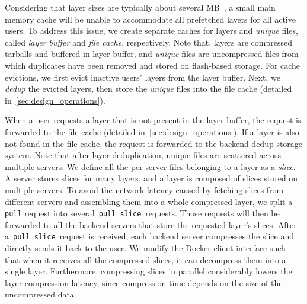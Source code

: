 


Considering that layer sizes are typically about several MB~\cite{dockerworkload}, 
a small main memory cache will be unable to accommodate
all prefetched layers for all active users. 
To address this issue, we 
create separate caches for layers and \emph{unique} files, called {\em layer buffer} and {\em file cache}, respectively. 
Note that, layers are  compressed tarballs and buffered in layer buffer, and 
 \emph{unique} files are uncompressed files from which duplicates have been removed and stored on flash-based storage. 
For 
cache evictions, we first evict inactive users' layers from the layer buffer.
Next, we \emph{dedup} the evicted layers, then store the \emph{unique} files
into the file cache (detailed in~\cref{sec:design_operations}). 

When a user requests a
layer that is not present in the layer buffer, the request is forwarded to the
file cache (detailed in~\cref{sec:design_operations}). 
If a layer is also not found in the
file cache, the request is forwarded to the backend dedup storage system.
Note that after layer deduplication, unique files are
scattered across multiple servers. 
We define all the per-server files belonging to a layer as a {\em slice}. 
A server stores slices for many layers, and a layer is composed of slices stored on multiple servers.
To avoid the network latency caused by fetching slices from different servers and
assembling them into a whole compressed layer, we split a \texttt{pull} request 
into several~\texttt{pull slice}~requests. Those requests will then be
forwarded to all the backend servers that store the requested
layer's slices. 
After a~\texttt{pull slice}~request is received, each backend server compresses the slice 
and directly sends it back to the user.
We modify the Docker client
interface such that when it receives all the compressed slices, it can
decompress them into a single layer. 
Furthermore, compressing slices in parallel considerably lowers the layer compression latency,
since compression time depends on the size of the
uncompressed data.

